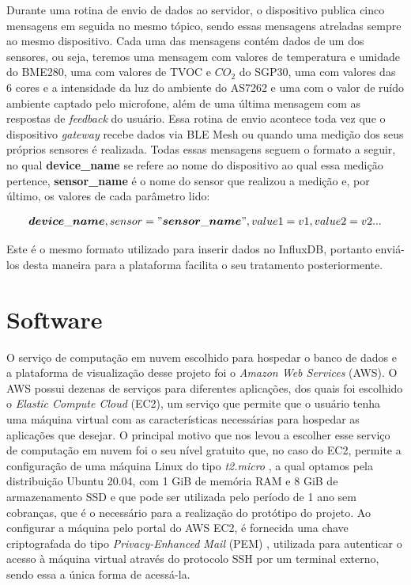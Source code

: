 \documentclass[../monografia.tex]{subfiles}
\begin{document}
Durante uma rotina de envio de dados ao servidor, o dispositivo publica cinco mensagens em seguida no mesmo tópico, sendo essas mensagens atreladas sempre ao mesmo dispositivo. Cada uma das mensagens contém dados de um dos sensores, ou seja, teremos uma mensagem com valores de temperatura e umidade do BME280, uma com valores de TVOC e $CO_{2}$ do SGP30, uma com valores das 6 cores e a intensidade da luz do ambiente do AS7262 e uma com o valor de ruído ambiente captado pelo microfone, além de uma última mensagem com as respostas de \textit{feedback} do usuário. Essa rotina de envio acontece toda vez que o dispositivo \textit{gateway} recebe dados via BLE Mesh ou quando uma medição dos seus próprios sensores é realizada. Todas essas mensagens seguem o formato a seguir, no qual \textbf{device\_name} se refere ao nome do dispositivo ao qual essa medição pertence, \textbf{sensor\_name} é o nome do sensor que realizou a medição e, por último, os valores de cada parâmetro lido:

\begin{align}
	\boldsymbol{device\_name},sensor="\boldsymbol{sensor\_name}", value1=v1,value2=v2 ... 
\end{align}

Este é o mesmo formato utilizado para inserir dados no InfluxDB, portanto enviá-los desta maneira para a plataforma facilita o seu tratamento posteriormente.


\section{Software}

O serviço de computação em nuvem escolhido para hospedar o banco de dados e a plataforma de visualização desse projeto foi o \textit{Amazon Web Services} (AWS). O AWS possui dezenas de serviços para diferentes aplicações, dos quais foi escolhido o \textit{Elastic Compute Cloud} (EC2), um serviço que permite que o usuário tenha uma máquina virtual com as características necessárias para hospedar as aplicações que desejar. O principal motivo que nos levou a escolher esse serviço de computação em nuvem foi o seu nível gratuito que, no caso do EC2, permite a configuração de uma máquina Linux do tipo \textit{t2.micro} \cite{aws-ec2-t2}, a qual optamos pela distribuição Ubuntu 20.04, com 1 GiB de memória RAM e 8 GiB de armazenamento SSD e que pode ser utilizada pelo período de 1 ano sem cobranças, que é o necessário para a realização do protótipo do projeto. Ao configurar a máquina pelo portal do AWS EC2, é fornecida uma chave criptografada do tipo \textit{Privacy-Enhanced Mail} (PEM) \cite{rfc1424}, utilizada para autenticar o acesso à máquina virtual através do protocolo SSH por um terminal externo, sendo essa a única forma de acessá-la. 
\end{document}
